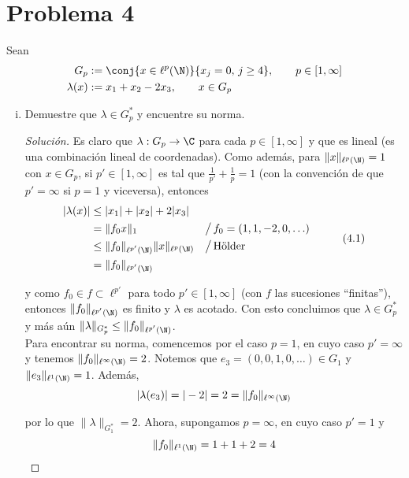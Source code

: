 \documentclass[duedate = 11 de Septiembre, 
			ramo = An\'alisis Funcional, 
			doctype = Tarea 1,
			semester = 2,
			year = 2017]{tarea}
\begin{document}
\newpage
\section*{Problema 4}
Sean
	\begin{align*}
		G_{p}
			&:=	\conj{x \in \ell^{p}(\N)}{x_{j} = 0, \, j \geq 4}, \qquad p \in [1,\infty]	\\
		\lambda(x)
			&:=	x_{1} + x_{2} - 2x_{3}, \qquad x \in G_{p}
	\end{align*}

\begin{enumerate}[(i)]
	\item Demuestre que $\lambda \in G_{p}^{*}$ y encuentre su norma.
	
	\begin{proof}[Solución] Es claro que $\lambda: G_{p} \to \C$ para cada $p \in [1,\infty]$ y que es lineal (es una combinación lineal de coordenadas). Como además, para $\|x\|_{\ell^{p}(\N)} = 1$ con $x \in G_{p}$, si $p' \in [1,\infty]$ es tal que $\frac{1}{p'} + \frac{1}{p} = 1$ (con la convención de que $p' = \infty$ si $p = 1$ y viceversa), entonces
		\[ \begin{aligned}
			|\lambda(x)|
				&\leq		|x_{1}| + |x_{2}| + 2|x_{3}|	\\
				&=		\| f_{0} x\|_{1}						&&\big/\, f_{0} = (1,1,-2,0,\ldots)	\\
				&\leq		\|f_{0}\|_{\ell^{p'}(\N)} \|x\|_{\ell^{p}(\N)}	&&\big/\, \text{H\"older}	\\
				&=		\|f_{0}\|_{\ell^{p'}(\N)}
		\end{aligned} \tag{4.1} \]
	
	y como $f_{0} \in f \subset \ell^{p'}$ para todo $p' \in [1,\infty]$ (con $f$ las sucesiones ``finitas''), entonces $\|f_{0}\|_{\ell^{p'}(\N)}$ es finito y $\lambda$ es acotado. Con esto concluimos que $\lambda \in G_{p}^{*}$ y más aún $\|\lambda\|_{G_{p}^{*}} \leq \|f_{0}\|_{\ell^{p'}(\N)}$.	\\
	
	Para encontrar su norma, comencemos por el caso $p = 1$, en cuyo caso $p' = \infty$ y tenemos $\|f_{0}\|_{\ell^{\infty}(\N)} = 2$. Notemos que $e_{3} = (0,0,1,0,\ldots) \in G_{1}$ y $\|e_{3}\|_{\ell^{1}(\N)} = 1$. Además,
		$$|\lambda(e_{3})| = |-2| = 2 = \|f_{0}\|_{\ell^{\infty}(\N)}$$
	
	por lo que $\|\lambda\|_{G_{1}^{*}} = 2$. Ahora, supongamos $p = \infty$, en cuyo caso $p' = 1$ y
		$$\|f_{0}\|_{\ell^{1}(\N)} = 1 + 1 + 2 = 4$$
	

\end{proof}
\end{enumerate}
\end{document}
